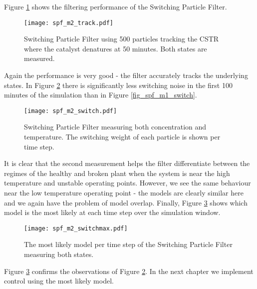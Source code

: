 Figure \ref{fig_spf_m2_track} shows the filtering performance of the Switching Particle Filter. 
\begin{figure}[H] 
\centering
\texttt{[image: spf\_m2\_track.pdf]}
\caption{Switching Particle Filter using 500 particles tracking the CSTR where the catalyst denatures at 50 minutes. Both states are measured.}
\label{fig_spf_m2_track}
\end{figure}
Again the performance is very good - the filter accurately tracks the underlying states. In Figure \ref{fig_spf_m2_switch} there is significantly less switching noise in the first 100 minutes of the simulation than in Figure \ref{fig_spf_m1_switch}.
\begin{figure}[H] 
\centering
\texttt{[image: spf\_m2\_switch.pdf]}
\caption{Switching Particle Filter measuring both concentration and temperature. The switching weight of each particle is shown per time step.}
\label{fig_spf_m2_switch}
\end{figure} 
It is clear that the second measurement helps the filter differentiate between the regimes of the healthy and broken plant when the system is near the high temperature and unstable operating points. However, we see the same behaviour near the low temperature operating point - the models are clearly similar here and we again have the problem of model overlap. Finally, Figure \ref{fig_spf_m2_switchmax} shows which model is the most likely at each time step over the simulation window. 
\begin{figure}[H] 
\centering
\texttt{[image: spf\_m2\_switchmax.pdf]}
\caption{The most likely model per time step of the Switching Particle Filter measuring both states.}
\label{fig_spf_m2_switchmax}
\end{figure} 
Figure \ref{fig_spf_m2_switchmax} confirms the observations of Figure \ref{fig_spf_m2_switch}. In the next chapter we implement control using the most likely model. 
